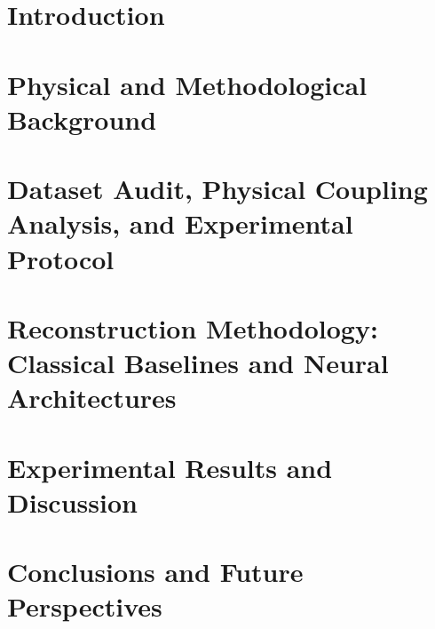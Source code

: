 \documentclass{Configuration_Files/PoliMi3i_thesis}
\begin{document}
\mainmatter

\chapter{Introduction}
\label{ch:introduction}%


\chapter{Physical and Methodological Background}
\label{ch:background}%


\chapter{Dataset Audit, Physical Coupling Analysis, and Experimental Protocol}
\label{ch:dataset}%


\chapter{Reconstruction Methodology: Classical Baselines and Neural Architectures}
\label{ch:methodology}%


\chapter{Experimental Results and Discussion}
\label{ch:results}%


\chapter{Conclusions and Future Perspectives}
\label{ch:conclusions}%




\cleardoublepage
\listoffigures
\listoftables
\end{document}
